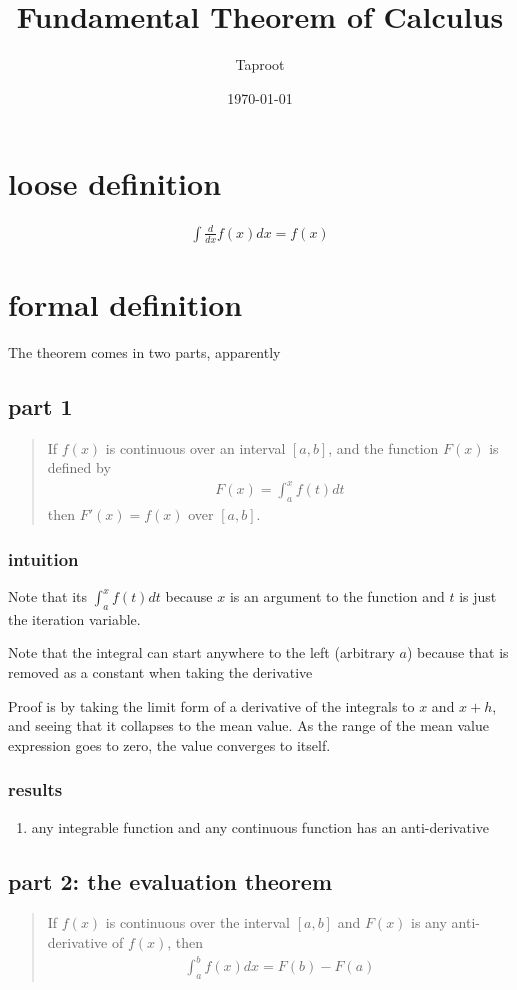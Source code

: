 \documentclass[letterpaper]{article}
\author{Taproot}
\date{\today}
\title{Fundamental Theorem of Calculus}
\renewcommand{\tableofcontents}{}
\begin{document}
\tableofcontents

\section{loose definition}
\label{sec:org3f6e73d}
\[\begin{aligned}
  \int \frac{d}{dx}f(x) dx = f(x)
  \end{aligned}\]
\section{formal definition}
\label{sec:orgb8254ff}
The theorem comes in two parts, apparently
\subsection{part 1}
\label{sec:org1768597}
\begin{quote}
If \(f(x)\) is continuous over an interval \([a, b]\), and the function \(F(x)\) is defined by
\[\begin{aligned}
   F(x) = \int_{a}^{x} f(t) dt
   \end{aligned}\]
then \(F'(x) = f(x)\) over \([a, b]\).
\end{quote}
\subsubsection{intuition}
\label{sec:org4d86ed2}
Note that its \(\int_{a}^{x} f(t) dt\) because \(x\) is an argument to the function and \(t\) is just the iteration variable.

Note that the integral can start anywhere to the left (arbitrary \(a\)) because that is removed as a constant when taking the derivative

Proof is by taking the limit form of a derivative of the integrals to \(x\) and \(x+h\), and seeing that it collapses to the mean value. As the range of the mean value expression goes to zero, the value converges to itself.
\subsubsection{results}
\label{sec:org818161c}
\begin{enumerate}
\item any integrable function and any continuous function has an anti-derivative
\label{sec:org95d3903}
\end{enumerate}
\subsection{part 2: the evaluation theorem}
\label{sec:org7d110bc}
\begin{quote}
If \(f(x)\) is continuous over the interval \([a, b]\) and \(F(x)\) is any anti-derivative of \(f(x)\), then
\[\begin{aligned}
   \int_{a}^{b} f(x) dx = F(b) - F(a)
   \end{aligned}\]
\end{quote}
\end{document}
